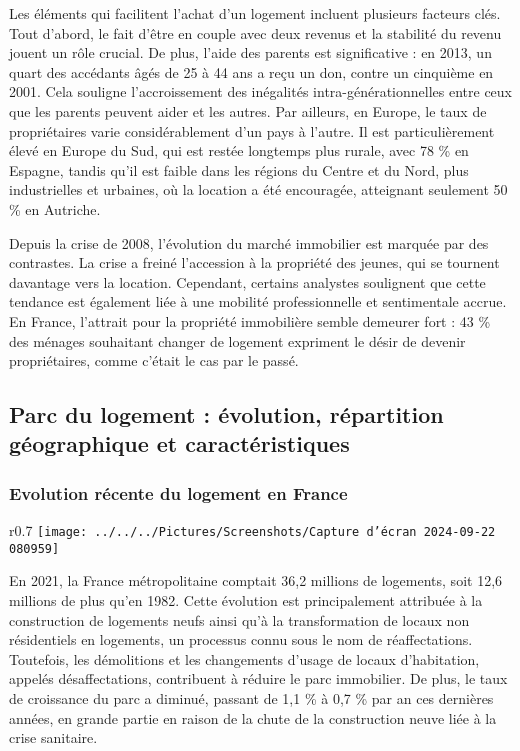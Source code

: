 \documentclass[a4paper, 12pt]{report}
\begin{document}
Les éléments qui facilitent l’achat d’un logement incluent plusieurs facteurs clés. Tout d’abord, le fait d’être en couple avec deux revenus et la stabilité du revenu jouent un rôle crucial. De plus, l’aide des parents est significative : en 2013, un quart des accédants âgés de 25 à 44 ans a reçu un don, contre un cinquième en 2001. Cela souligne l’accroissement des inégalités intra-générationnelles entre ceux que les parents peuvent aider et les autres. Par ailleurs, en Europe, le taux de propriétaires varie considérablement d’un pays à l’autre. Il est particulièrement élevé en Europe du Sud, qui est restée longtemps plus rurale, avec 78 \% en Espagne, tandis qu'il est faible dans les régions du Centre et du Nord, plus industrielles et urbaines, où la location a été encouragée, atteignant seulement 50 \% en Autriche.

Depuis la crise de 2008, l’évolution du marché immobilier est marquée par des contrastes. La crise a freiné l’accession à la propriété des jeunes, qui se tournent davantage vers la location. Cependant, certains analystes soulignent que cette tendance est également liée à une mobilité professionnelle et sentimentale accrue. En France, l’attrait pour la propriété immobilière semble demeurer fort : 43 \% des ménages souhaitant changer de logement expriment le désir de devenir propriétaires, comme c’était le cas par le passé.

\subsection{Parc du logement : évolution, répartition géographique et caractéristiques}

\subsubsection{Evolution récente du logement en France}

\begin{wrapfigure}{r}{0.7\textwidth}
	\centering
	\texttt{[image: ../../../Pictures/Screenshots/Capture d'écran 2024-09-22 080959]}
\end{wrapfigure}

En 2021, la France métropolitaine comptait 36,2 millions de logements, soit 12,6 millions de plus qu’en 1982. Cette évolution est principalement attribuée à la construction de logements neufs ainsi qu’à la transformation de locaux non résidentiels en logements, un processus connu sous le nom de réaffectations. Toutefois, les démolitions et les changements d’usage de locaux d’habitation, appelés désaffectations, contribuent à réduire le parc immobilier. De plus, le taux de croissance du parc a diminué, passant de 1,1 \% à 0,7 \% par an ces dernières années, en grande partie en raison de la chute de la construction neuve liée à la crise sanitaire.
\end{document}
